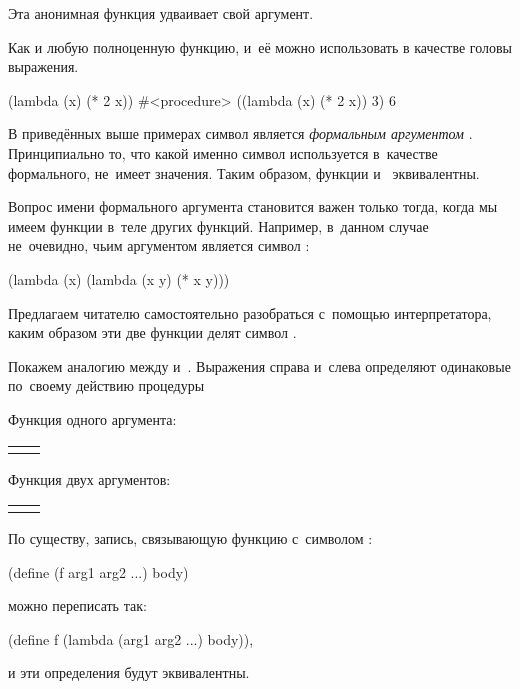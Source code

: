 \begin{example}{%
Эта анонимная функция удваивает свой аргумент.

Как и любую полноценную функцию, и~её можно использовать в качестве головы выражения.}
\REPL
  {(lambda (x) (* 2 x))}
  {\#<procedure>}
\REPL
  {((lambda (x) (* 2 x)) 3)}
  {6}
\end{example}

В приведённых выше примерах символ  является \emph{формальным аргументом} . Принципиально то, что какой именно символ используется в~качестве формального, не~имеет значения.
Таким образом, функции  и~ эквивалентны.

Вопрос имени формального аргумента становится важен только тогда, когда мы имеем функции в~теле других функций. Например, в~данном случае не~очевидно, чьим аргументом является символ :
\begin{SchemeCode}[emph={x,y}]
(lambda (x) (lambda (x y) (* x y)))
\end{SchemeCode}

\noindent Предлагаем читателю самостоятельно разобраться с~помощью интерпретатора, каким образом эти две функции делят символ .

Покажем аналогию между  и~. Выражения справа и~слева определяют одинаковые по~своему действию процедуры

\label{lambda-arity}
Функция одного аргумента:

\begin{tabular}{*{2}{p{}}}
\parbox{0.5\textwidth}
{}
&
\parbox{0.5\textwidth}
{}
\end{tabular}

Функция двух аргументов:

\begin{tabular}{*{2}{p{}}}
\parbox{0.5\textwidth}
{}
&
\parbox{0.5\textwidth}
{}
\end{tabular}
По существу, запись, связывающую функцию с~символом :
\begin{SchemeCode}
(define (f arg1 arg2 ...) body)
\end{SchemeCode}
можно переписать так:
\begin{SchemeCode}
(define f (lambda (arg1 arg2 ...) body)),
\end{SchemeCode}
\noindent и эти определения будут эквивалентны.

